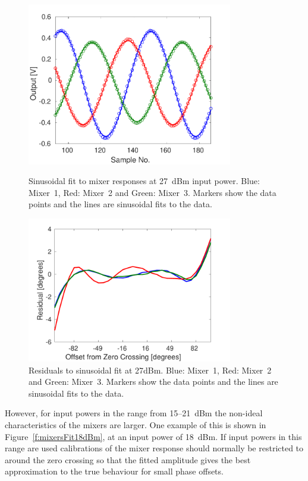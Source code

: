 \begin{figure}
  \centering
  \includegraphics[width=0.8\textwidth]{Figures/phaseMons/mixersFit27dBm}
  \caption{Sinusoidal fit to mixer responses at 27~dBm input power. Blue: Mixer~1, Red: Mixer~2 and Green: Mixer~3. Markers show the data points and the lines are sinusoidal fits to the data. }
  \label{f:mixersFit27dBm}
  \includegraphics[width=0.8\textwidth]{Figures/phaseMons/mixersFitResid27dBm}
  \caption{Residuals to sinusoidal fit at 27dBm. Blue: Mixer~1, Red: Mixer~2 and Green: Mixer~3. Markers show the data points and the lines are sinusoidal fits to the data.}
  \label{f:mixersFitResid27dBm}
\end{figure}

However, for input powers in the range from 15--21~dBm the non-ideal characteristics of the mixers are larger. One example of this is shown in Figure~\ref{f:mixersFit18dBm}, at an input power of 18~dBm. If input powers in this range are used calibrations of the mixer response should normally be restricted to around the zero crossing so that the fitted amplitude gives the best approximation to the true behaviour for small phase offsets. 

